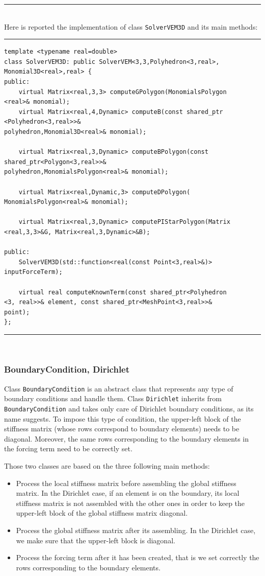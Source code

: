 \noindent\rule{12.7cm}{1pt}\\

Here is reported the implementation of class \verb|SolverVEM3D| and its main methods:

\noindent\rule{12.7cm}{1pt}
\begin{lstlisting}[caption=File \texttt{SolverVEM3D.h}]
template <typename real=double>
class SolverVEM3D: public SolverVEM<3,3,Polyhedron<3,real>,
Monomial3D<real>,real> {
public:
    virtual Matrix<real,3,3> computeGPolygon(MonomialsPolygon
<real>& monomial);
    virtual Matrix<real,4,Dynamic> computeB(const shared_ptr
<Polyhedron<3,real>>& 
polyhedron,Monomial3D<real>& monomial);

    virtual Matrix<real,3,Dynamic> computeBPolygon(const 
shared_ptr<Polygon<3,real>>& 
polyhedron,MonomialsPolygon<real>& monomial);

    virtual Matrix<real,Dynamic,3> computeDPolygon(
MonomialsPolygon<real>& monomial);
		
    virtual Matrix<real,3,Dynamic> computePIStarPolygon(Matrix
<real,3,3>&G, Matrix<real,3,Dynamic>&B);
	
public:
    SolverVEM3D(std::function<real(const Point<3,real>&)> 
inputForceTerm);
 
    virtual real computeKnownTerm(const shared_ptr<Polyhedron
<3, real>>& element, const shared_ptr<MeshPoint<3,real>>& 
point);	
};

\end{lstlisting}
\noindent\rule{12.7cm}{1pt}\\

\subsubsection{BoundaryCondition, Dirichlet}
Class \verb|BoundaryCondition| is an abstract class that represents any type of boundary conditions and handle them. Class \verb|Dirichlet| inherits from \verb|BoundaryCondition| and takes only care of Dirichlet boundary conditions, as its name suggests. To impose this type of condition, the upper-left block of the stiffness matrix (whose rows correspond to boundary elements) needs to be diagonal. Moreover, the same rows corresponding to the boundary elements in the forcing term need to be correctly set. 

Those two classes are based on the three following main methods: 
\begin{itemize}
\item Process the local stiffness matrix before assembling the global stiffness matrix. In the Dirichlet case, if an element is on the boundary, its local stiffness matrix is not assembled with the other ones in order to keep the upper-left block of the global stiffness matrix diagonal. 
\item Process the global stiffness matrix after its assembling. In the Dirichlet case, we make sure that the upper-left block is diagonal. 
\item Process the forcing term after it has been created, that is we set correctly the rows corresponding to the boundary elements. 
\end{itemize}

